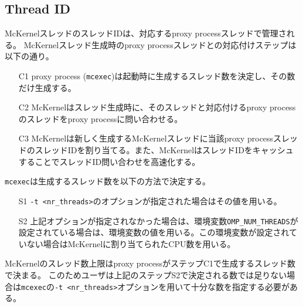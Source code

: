 \documentclass[twoside,11pt,fleqn]{book}
\begin{document}
\subsection{Thread ID}
McKernelスレッドのスレッドIDは、対応するproxy processスレッドで管理される。
McKernelスレッド生成時のproxy processスレッドとの対応付けステップは以下の通り。
\begin{itemize}
\item[C1] proxy process (\texttt{mcexec})は起動時に生成するスレッド数を決定し、その数だけ生成する。
\item[C2] McKernelはスレッド生成時に、そのスレッドと対応付けるproxy processのスレッドをproxy processに問い合わせる。
\item[C3] McKernelは新しく生成するMcKernelスレッドに当該proxy processスレッドのスレッドIDを割り当てる。また、McKernelはスレッドIDをキャッシュすることでスレッドID問い合わせを高速化する。
\end{itemize}

\texttt{mcexec}は生成するスレッド数を以下の方法で決定する。
\begin{itemize}
\item[S1] \texttt{-t <nr\_threads>}のオプションが指定された場合はその値を用いる。
\item[S2] 上記オプションが指定されなかった場合は、環境変数\texttt{OMP\_NUM\_THREADS}が設定されている場合は、環境変数の値を用いる。この環境変数が設定されていない場合はMcKernelに割り当てられたCPU数を用いる。
\end{itemize}

McKernelのスレッド数上限はproxy processがステップC1で生成するスレッド数で決まる。
このためユーザは上記のステップS2で決定される数では足りない場合は\texttt{mcexec}の\texttt{-t <nr\_threads>}オプションを用いて十分な数を指定する必要がある。


\subsection{}

\subsection{}
\end{document}
